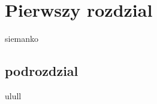 \documentclass[12pt]{article}
\begin{document}
\section{Pierwszy rozdzial}
siemanko

\subsection{podrozdzial}
ulull
\end{document}
